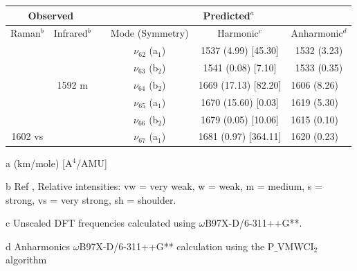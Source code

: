   
 
  \begin{table}[H]
   	\begin{center}
  		\begin{threeparttable}
  			\begin{tabular}{c c c c c c}
  				\hline
  				\multicolumn{ 2}{c}{Observed} & \multicolumn{1}{c}{} & \multicolumn{ 3}{c}{Predicted$^{a}$} \\ \hline
  				Raman$^{b}$ & \multicolumn{1}{c}{Infrared$^{b}$} &  & \multicolumn{1}{c}{Mode (Symmetry)} & \multicolumn{1}{c}{Harmonic$^{c}$} & Anharmonic$^{d}$ \\ \hline 
 &  & \multicolumn{1}{l}{} & $\nu_{62}$ (a$_{1}$) & 1537 (4.99) [45.30] & 1532 (3.23) \\ 
 &  & \multicolumn{1}{l}{} &  $\nu_{63}$ (b$_{2}$) & 1541 (0.08) [7.10] & 1533 (0.35) \\ 
 &  1592 m & \multicolumn{1}{l}{} &  $\nu_{64}$ (b$_{2}$) & 1669 (17.13) [82.20] & \multicolumn{1}{l}{1606 (8.26)} \\ 
 &  & \multicolumn{1}{l}{} &    $\nu_{65}$ (a$_{1}$) & 1670 (15.60) [0.03] & \multicolumn{1}{l}{1619 (5.30)} \\ 
 &  & \multicolumn{1}{l}{} &$\nu_{66}$ (b$_{2}$) & 1679 (0.05) [10.06] & \multicolumn{1}{l}{1615 (0.10)} \\ 
 1602 vs &  & \multicolumn{1}{l}{} & $\nu_{67}$ (a$_{1}$) & 1681 (0.97) [364.11] & \multicolumn{1}{l}{1620 (0.23)} \\ 
\bottomrule
\end{tabular}

\begin{tablenotes}
	\item[a] (km/mole) [A$^{4}$/AMU]
	\item[b] Ref \cite{michaelian2014raman}, Relative intensities: vw = very weak, w = weak, m = medium, s = strong, vs = very strong, sh = shoulder.
	\item[c] Unscaled DFT frequencies calculated using $\omega$B97X-D/6-311++G**.
	\item[d] Anharmonics $\omega$B97X-D/6-311++G** calculation using the P$\_$VMWCI$_{2}$ algorithm
\end{tablenotes}
\end{threeparttable}
\end{center}
\label{freq-18-dimethylfluorene}
\end{table}


